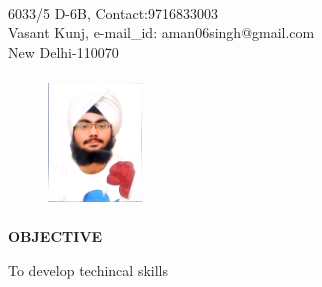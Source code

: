 \documentclass{article}
\begin{document}
\\


\begin{flushleft}
6033/5 D-6B, \hfill{Contact:9716833003}\\
Vasant Kunj, \hfill{e-mail\_id: aman06singh@gmail.com}\\
New Delhi-110070\\
\end{flushleft}

\begin{figure}[h]
\begin{flushright}	
\includegraphics[width=2.5cm, height=3.5cm]{pic.jpg}	
\end{flushright}
\end{figure}

\begin{flushleft}
\textbf{OBJECTIVE }
\begin{flushright}
\vspace{-0.2in}
To develop techincal skills
\end{flushright}
\end{flushleft}
\end{document}
